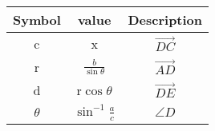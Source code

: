 \begin{tabular}{|c|c|c|}
\hline
Symbol & value & Description\\
\hline
c & x & $\vec{DC}$\\
\hline
r & $\frac{b}{\sin{\theta}}$ & $\vec{AD}$ \\
\hline
d & r$\cos{\theta}$ & $\vec{DE}$ \\
\hline
$\theta$ & $\sin^{-1}\frac{a}{c}$ & $\angle{D}$ \\
\hline
\end{tabular}

